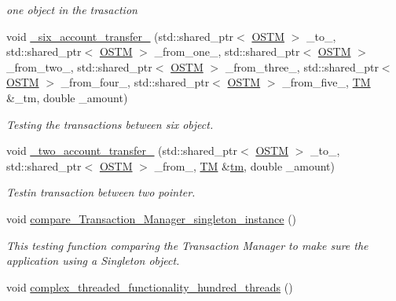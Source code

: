 \begin{DoxyCompactItemize}
\begin{DoxyCompactList}\small\item\em one object in the trasaction \end{DoxyCompactList}\item 
void \hyperlink{class_my_test_c_ase_a72ce436fb3c78c3d76b6c48a5a2e6a76_a72ce436fb3c78c3d76b6c48a5a2e6a76}{\+\_\+six\+\_\+account\+\_\+transfer\+\_\+} (std\+::shared\+\_\+ptr$<$ \hyperlink{class_o_s_t_m}{O\+S\+TM} $>$ \+\_\+to\+\_\+, std\+::shared\+\_\+ptr$<$ \hyperlink{class_o_s_t_m}{O\+S\+TM} $>$ \+\_\+from\+\_\+one\+\_\+, std\+::shared\+\_\+ptr$<$ \hyperlink{class_o_s_t_m}{O\+S\+TM} $>$ \+\_\+from\+\_\+two\+\_\+, std\+::shared\+\_\+ptr$<$ \hyperlink{class_o_s_t_m}{O\+S\+TM} $>$ \+\_\+from\+\_\+three\+\_\+, std\+::shared\+\_\+ptr$<$ \hyperlink{class_o_s_t_m}{O\+S\+TM} $>$ \+\_\+from\+\_\+four\+\_\+, std\+::shared\+\_\+ptr$<$ \hyperlink{class_o_s_t_m}{O\+S\+TM} $>$ \+\_\+from\+\_\+five\+\_\+, \hyperlink{class_t_m}{TM} \&\+\_\+tm, double \+\_\+amount)
\begin{DoxyCompactList}\small\item\em Testing the transactions between six object. \end{DoxyCompactList}\item 
void \hyperlink{class_my_test_c_ase_af0cc86421d281cc4a583a394ae86dbdd_af0cc86421d281cc4a583a394ae86dbdd}{\+\_\+two\+\_\+account\+\_\+transfer\+\_\+} (std\+::shared\+\_\+ptr$<$ \hyperlink{class_o_s_t_m}{O\+S\+TM} $>$ \+\_\+to\+\_\+, std\+::shared\+\_\+ptr$<$ \hyperlink{class_o_s_t_m}{O\+S\+TM} $>$ \+\_\+from\+\_\+, \hyperlink{class_t_m}{TM} \&\hyperlink{class_my_test_c_ase_a422e6e5d4ddedea384be96031c89b72b_a422e6e5d4ddedea384be96031c89b72b}{tm}, double \+\_\+amount)
\begin{DoxyCompactList}\small\item\em Testin transaction between two pointer. \end{DoxyCompactList}\item 
void \hyperlink{class_my_test_c_ase_a124c2540c72219b92c477a1fbda21409_a124c2540c72219b92c477a1fbda21409}{compare\+\_\+\+Transaction\+\_\+\+Manager\+\_\+singleton\+\_\+instance} ()
\begin{DoxyCompactList}\small\item\em This testing function comparing the Transaction Manager to make sure the application using a Singleton object. \end{DoxyCompactList}\item 
void \hyperlink{class_my_test_c_ase_a8a198d6ef96a8a07ea7fa839ad068ffb_a8a198d6ef96a8a07ea7fa839ad068ffb}{complex\+\_\+threaded\+\_\+functionality\+\_\+hundred\+\_\+threads} ()

\end{DoxyCompactItemize}
